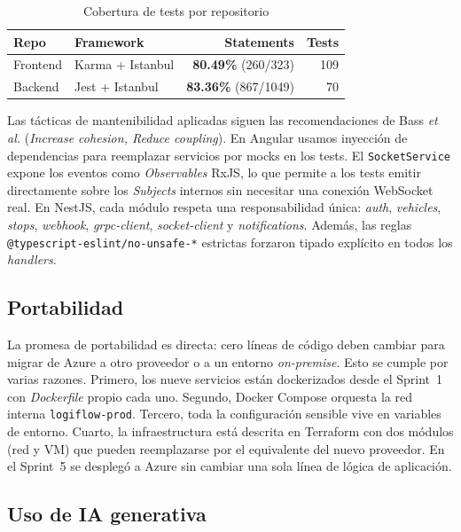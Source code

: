 \documentclass[conference]{IEEEtran}
\begin{document}
\begin{table}[ht]
\caption{Cobertura de tests por repositorio}
\label{tab:coverage}
\centering
\renewcommand{\arraystretch}{1.2}
\begin{tabular}{llrr}
\toprule
\textbf{Repo} & \textbf{Framework} & \textbf{Statements} & \textbf{Tests} \\
\midrule
Frontend & Karma + Istanbul & \textbf{80.49\%} (260/323) & 109 \\
Backend & Jest + Istanbul & \textbf{83.36\%} (867/1049) & 70 \\
\bottomrule
\end{tabular}
\end{table}

Las t\'acticas de mantenibilidad aplicadas siguen las recomendaciones de Bass \emph{et al.} (\emph{Increase cohesion, Reduce coupling}). En Angular usamos inyecci\'on de dependencias para reemplazar servicios por mocks en los tests. El \texttt{SocketService} expone los eventos como \emph{Observables} RxJS, lo que permite a los tests emitir directamente sobre los \emph{Subjects} internos sin necesitar una conexi\'on WebSocket real. En NestJS, cada m\'odulo respeta una responsabilidad \'unica: \emph{auth}, \emph{vehicles}, \emph{stops}, \emph{webhook}, \emph{grpc-client}, \emph{socket-client} y \emph{notifications}. Adem\'as, las reglas \texttt{@typescript-eslint/no-unsafe-*} estrictas forzaron tipado expl\'icito en todos los \emph{handlers}.

\subsection{Portabilidad}

La promesa de portabilidad es directa: cero l\'ineas de c\'odigo deben cambiar para migrar de Azure a otro proveedor o a un entorno \emph{on-premise}. Esto se cumple por varias razones. Primero, los nueve servicios est\'an dockerizados desde el Sprint~1 con \emph{Dockerfile} propio cada uno. Segundo, Docker Compose orquesta la red interna \texttt{logiflow-prod}. Tercero, toda la configuraci\'on sensible vive en variables de entorno. Cuarto, la infraestructura est\'a descrita en Terraform \cite{terraform} con dos m\'odulos (red y VM) que pueden reemplazarse por el equivalente del nuevo proveedor. En el Sprint~5 se despleg\'o a Azure sin cambiar una sola l\'inea de l\'ogica de aplicaci\'on.

\subsection{Uso de IA generativa}
\end{document}
